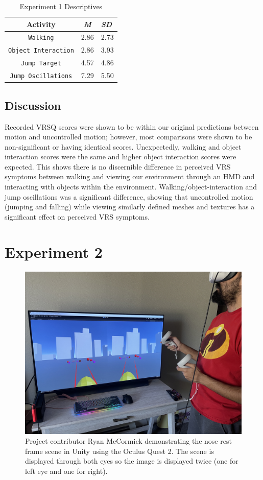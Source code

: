 \documentclass[sigconf]{acmart}
\begin{document}
\begin{table}
  \caption{Experiment 1 Descriptives}
  \label{tab:commands}
  \begin{tabular}{ccl}
    \toprule
    Activity & \textit{M} & \textit{SD}\\
    \midrule
    \texttt{Walking} & 2.86 & 2.73 \\
    \texttt{Object Interaction}& 2.86 & 3.93\\
    \texttt{Jump Target}& 4.57& 4.86\\
    \texttt{Jump Oscillations}& 7.29 & 5.50\\
    \bottomrule
  \end{tabular}
\end{table}

\subsection{Discussion}
Recorded VRSQ scores were shown to be within our original predictions between motion and uncontrolled motion; however, most comparisons were shown to be non-significant or having identical scores. Unexpectedly, walking and object interaction scores were the same and higher object interaction scores were expected. This shows there is no discernible difference in perceived VRS symptoms between walking and viewing our environment through an HMD and interacting with objects within the environment. Walking/object-interaction  and jump oscillations was a significant difference, showing that uncontrolled motion (jumping and falling) while viewing similarly defined meshes and textures has a significant effect on perceived VRS symptoms. 


\section{Experiment 2}
\begin{figure}[h]
  \centering
  \includegraphics[width=\linewidth]{samples/IMG_1811.jpg}
  \caption{Project contributor Ryan McCormick demonstrating the nose rest frame scene in Unity using the Oculus Quest 2. The scene is displayed through both eyes so the image is displayed twice (one for left eye and one for right).}
\end{figure}
\end{document}
